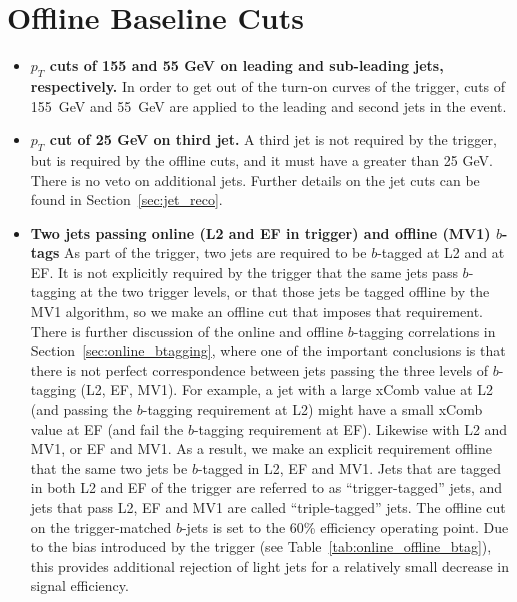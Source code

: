 









\section{Offline Baseline Cuts}


\begin{itemize}
\item
\textbf{$p_T$ cuts of 155 and 55 GeV on leading and sub-leading jets, respectively.}
In order to get out of the \pt turn-on curves of the trigger, cuts of
155~GeV and 55~GeV are applied to the leading and second jets in the
event.
\item
\textbf{$p_T$ cut of 25 GeV on third jet.}
A third jet is not required by the trigger, but is required by
the offline cuts, and it must have a \pt greater than 25 GeV.  There is
no veto on additional jets.  Further details on the jet cuts can be found
in Section~\ref{sec:jet_reco}.
\item
\textbf{Two jets passing online (L2 and EF in trigger) and offline (MV1) $b$-tags}
As part of the trigger, two jets are required to be $b$-tagged at L2 and at EF.  It
is not explicitly required by the trigger that the same jets pass $b$-tagging at the two trigger levels,
or that those jets be tagged offline by the MV1 algorithm, so we make an
offline cut that imposes that requirement.  There is further discussion of the online
and offline $b$-tagging correlations in Section~\ref{sec:online_btagging},
where one of the important conclusions is that there is not perfect correspondence
between jets passing the three levels of $b$-tagging (L2, EF, MV1).  For
example, a jet with a large xComb value at L2 (and passing the $b$-tagging
requirement at L2) might have a small xComb value at EF (and fail the $b$-tagging
requirement at EF).  Likewise with L2 and MV1, or EF and MV1.  As a result, we
make an explicit requirement offline that the same two jets be $b$-tagged in L2, EF
and MV1.  Jets that are tagged in both L2 and EF of the trigger are referred to as
``trigger-tagged'' jets, and jets that pass L2, EF and MV1 are called ``triple-tagged''
jets.
The offline cut on the
trigger-matched $b$-jets is set to the 60\% efficiency
operating point. Due to the bias introduced by the trigger (see
Table~\ref{tab:online_offline_btag}), this provides additional rejection of
light jets for a relatively small decrease in signal efficiency.



\end{itemize}
